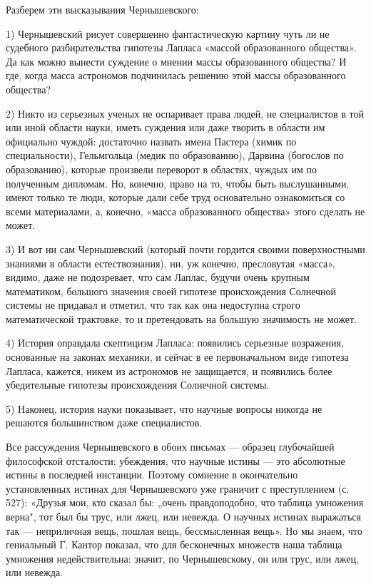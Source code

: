 Разберем эти высказывания Чернышевского:

1)  Чернышевский  рисует  совершенно фантастическую  картину  чуть  ли
не  судебного разбирательства  гипотезы Лапласа  «массой образованного
общества». Да как можно вынести  суждение о мнении массы образованного
общества? И где, когда масса астрономов подчинилась решению этой массы
образованного общества?

2)  Никто   из  серьезных  ученых   не  оспаривает  права   людей,  не
специалистов в  той или  иной области науки,  иметь суждения  или даже
творить  в  области им  официально  чуждой:  достаточно назвать  имена
Пастера (химик по специальности),  Гельмгольца (медик по образованию),
Дарвина  (богослов  по  образованию), которые  произвели  переворот  в
областях, чуждых им по полученным  дипломам. Но, конечно, право на то,
чтобы быть выслушанными, имеют только  те люди, которые дали себе труд
основательно  ознакомиться со  всеми материалами,  а, конечно,  «масса
образованного общества» этого сделать не может.

3)  И  вот   ни  сам  Чернышевский  (который   почти  гордится  своими
поверхностными  знаниями в  области естествознания),  ни, уж  конечно,
пресловутая  «масса», видимо,  даже  не подозревает,  что сам  Лаплас,
будучи  очень крупным  математиком, большого  значения своей  гипотезе
происхождения Солнечной системы не придавал и отметил, что так как она
недоступна  строго  математической  трактовке, то  и  претендовать  на
большую значимость не может.

4)   История  оправдала   скептицизм   Лапласа:  появились   серьезные
возражения,   основанные  на   законах   механики,  и   сейчас  в   ее
первоначальном виде гипотеза Лапласа,  кажется, никем из астрономов не
защищается,  и  появились  более убедительные  гипотезы  происхождения
Солнечной системы.

5) Наконец, история  науки показывает, что научные  вопросы никогда не
решаются большинством даже специалистов.

Все рассуждения Чернышевского в  обоих письмах --- образец глубочайшей
философской  отсталости:   убеждения,  что  научные  истины   ---  это
абсолютные   истины  в   последней  инстанции.   Поэтому  сомнение   в
окончательно  установленных  истинах  для Чернышевского  уже  граничит
с  преступлением  (с.  527):  «Друзья   мои,  кто  сказал  бы:  „очень
правдоподобно,  что таблица  умножения верна",  тот был  бы трус,  или
лжец, или  невежда. О научных  истинах выражаться так  --- неприличная
вещь, пошлая вещь, бессмысленная вещь». Но мы знаем, что гениальный Г.
Кантор показал,  что для  бесконечных множеств наша  таблица умножения
недействительна: значит, по Чернышевскому, он  или трус, или лжец, или
невежда.

